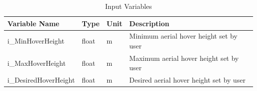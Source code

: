 \documentclass{article}
\begin{document}
\begin{table}[!h]
\begin{center}
\caption {Input Variables} \label{tab:title}
\label{InputVariables}
\begin{tabular}{ | m{3cm} | m{2cm} | m{2cm} | m{6cm} | } 
\hline
 Variable Name & Type & Unit & Description \\ 
 \hline
 i\_MinHoverHeight & float	&m	& Minimum aerial hover height set by user\\
\hline i\_MaxHoverHeight & float	&m	& Maximum aerial hover height set by user\\
\hline i\_DesiredHoverHeight & float	&m	& Desired aerial hover height set by user\\
\hline 
\end{tabular}
\end{center}
\end{table}
\end{document}
